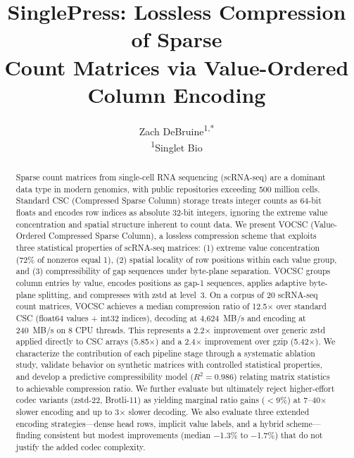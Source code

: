\documentclass[10pt,twocolumn,letterpaper]{article}
\title{SinglePress: Lossless Compression of Sparse\\Count Matrices via Value-Ordered Column Encoding}
\author{
  Zach DeBruine\textsuperscript{1,*}
  \\[6pt]
  \textsuperscript{1}Singlet Bio
}
\begin{document}
\maketitle
{}

\begin{abstract}
Sparse count matrices from single-cell RNA sequencing (scRNA-seq) are a dominant data type in modern genomics, with public repositories exceeding 500 million cells.
Standard CSC (Compressed Sparse Column) storage treats integer counts as 64-bit floats and encodes row indices as absolute 32-bit integers, ignoring the extreme value concentration and spatial structure inherent to count data.
We present VOCSC (Value-Ordered Compressed Sparse Column), a lossless compression scheme that exploits three statistical properties of scRNA-seq matrices: (1) extreme value concentration (72\% of nonzeros equal 1), (2) spatial locality of row positions within each value group, and (3) compressibility of gap sequences under byte-plane separation.
VOCSC groups column entries by value, encodes positions as gap-1 sequences, applies adaptive byte-plane splitting, and compresses with zstd at level~3.
On a corpus of 20 scRNA-seq count matrices, VOCSC achieves a median compression ratio of 12.5$\times$ over standard CSC (float64 values + int32 indices), decoding at 4,624~MB/s and encoding at 240~MB/s on 8 CPU threads.
This represents a 2.2$\times$ improvement over generic zstd applied directly to CSC arrays (5.85$\times$) and a 2.4$\times$ improvement over gzip (5.42$\times$).
We characterize the contribution of each pipeline stage through a systematic ablation study, validate behavior on synthetic matrices with controlled statistical properties, and develop a predictive compressibility model ($R^2 = 0.986$) relating matrix statistics to achievable compression ratio.
We further evaluate but ultimately reject higher-effort codec variants (zstd-22, Brotli-11) as yielding marginal ratio gains ($<$9\%) at 7--40$\times$ slower encoding and up to 3$\times$ slower decoding.
We also evaluate three extended encoding strategies---dense head rows, implicit value labels, and a hybrid scheme---finding consistent but modest improvements (median $-$1.3\% to $-$1.7\%) that do not justify the added codec complexity.
\end{abstract}


\end{document}
